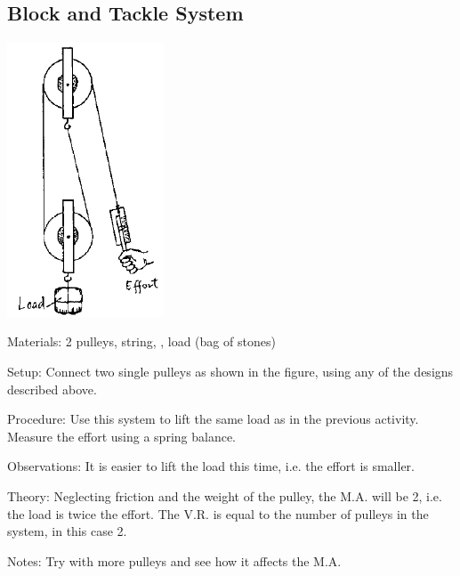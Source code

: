 \begin{multicols}{2}
\vfill
\columnbreak

\subsection{Block and Tackle System}

\begin{center}
\includegraphics[width=0.35\textwidth]{./img/source/pulley-system.png}
\end{center}

\begin{description*}
\item[Materials:]{2 pulleys, string, , load (bag of stones)}
\item[Setup:]{Connect two single pulleys as shown in the figure, using any of the designs described above.}
\item[Procedure:]{Use this system to lift the same load as in the previous activity. Measure the effort using a spring balance.}
\item[Observations:]{It is easier to lift the load this time, i.e. the effort is smaller.}
\item[Theory:]{Neglecting friction and the weight of the pulley, the M.A. will be 2, i.e. the load is twice the effort. The V.R. is equal to the number of pulleys in the system, in this case 2.}
\item[Notes:]{Try with more pulleys and see how it affects the M.A.}
\end{description*}


\end{multicols}
